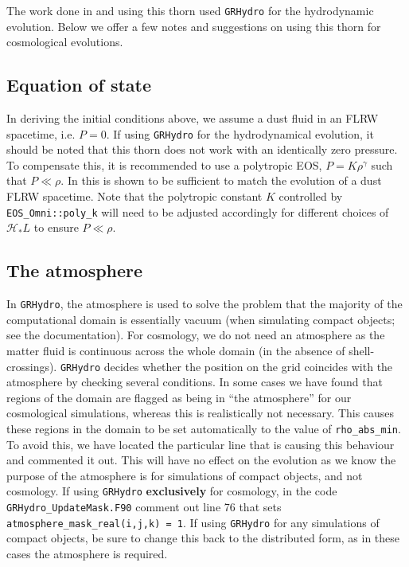 The work done in \cite{macpherson2017} and \cite{macpherson2019} using this thorn used {\tt GRHydro} for the hydrodynamic evolution. Below we offer a few notes and suggestions on using this thorn for cosmological evolutions. 

\subsection{Equation of state}

In deriving the initial conditions above, we assume a dust fluid in an FLRW spacetime, i.e. $P=0$. If using {\tt GRHydro} for the hydrodynamical evolution, it should be noted that this thorn does not work with an identically zero pressure. To compensate this, it is recommended to use a polytropic EOS, $P=K \rho^{\gamma}$ such that $P\ll\rho$. In \cite{macpherson2017} this is shown to be sufficient to match the evolution of a dust FLRW spacetime. Note that the polytropic constant $K$ controlled by \texttt{EOS\_Omni::poly\_k} will need to be adjusted accordingly for different choices of $\mathcal{H}_* L$ to ensure $P\ll\rho$.



\subsection{The atmosphere}

In {\tt GRHydro}, the atmosphere is used to solve the problem that the majority of the computational domain is essentially vacuum (when simulating compact objects; see the documentation). For cosmology, we do not need an atmosphere as the matter fluid is continuous across the whole domain (in the absence of shell-crossings). {\tt GRHydro} decides whether the position on the grid coincides with the atmosphere by checking several conditions. In some cases we have found that regions of the domain are flagged as being in ``the atmosphere'' for our cosmological simulations, whereas this is realistically not necessary. This causes these regions in the domain to be set automatically to the value of {\tt rho\_abs\_min}. To avoid this, we have located the particular line that is causing this behaviour and commented it out. This will have no effect on the evolution as we know the purpose of the atmosphere is for simulations of compact objects, and not cosmology. If using {\tt GRHydro} {\bf exclusively} for cosmology, in the code {\tt GRHydro\_UpdateMask.F90} comment out line 76 that sets {\tt atmosphere\_mask\_real(i,j,k) = 1}. If using {\tt GRHydro} for any simulations of compact objects, be sure to change this back to the distributed form, as in these cases the atmosphere is required. 





